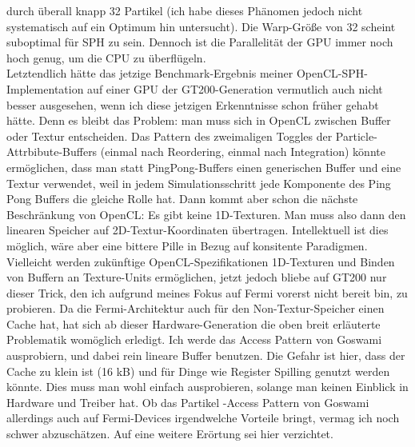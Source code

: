 \begin{enumerate}
		durch überall knapp 32 Partikel (ich habe dieses Phänomen jedoch nicht systematisch auf ein Optimum hin 	
		untersucht).
		Die Warp-Größe von 32 scheint suboptimal für SPH zu sein. Dennoch ist die Parallelität der GPU
		immer noch hoch genug, um die CPU zu überflügeln.\\
		Letztendlich hätte das jetzige Benchmark-Ergebnis meiner OpenCL-SPH-Implementation
		auf einer GPU der GT200-Generation vermutlich auch nicht besser ausgesehen, wenn ich diese 
		jetzigen Erkenntnisse schon früher gehabt hätte. Denn es bleibt das Problem: man muss sich in
		OpenCL zwischen Buffer oder Textur entscheiden.
		 Das Pattern des zweimaligen Toggles der Particle-Attrbibute-Buffers
		(einmal nach Reordering, einmal nach Integration) könnte ermöglichen, dass man statt PingPong-Buffers
		einen generischen Buffer und eine Textur verwendet, weil in jedem Simulationsschritt jede Komponente
		des Ping Pong Buffers die gleiche Rolle hat. Dann kommt aber schon die nächste Beschränkung von
		OpenCL: Es gibt keine 1D-Texturen. Man muss also dann den linearen Speicher auf 2D-Textur-Koordinaten
		übertragen. Intellektuell ist dies möglich, wäre aber eine bittere Pille in Bezug auf konsitente Paradigmen.
		Vielleicht werden zukünftige OpenCL-Spezifikationen 1D-Texturen und Binden von Buffern an Texture-Units
		ermöglichen, jetzt jedoch bliebe auf GT200 nur dieser Trick, den ich aufgrund meines Fokus auf Fermi vorerst 
		nicht bereit bin, zu probieren.
		Da die Fermi-Architektur auch für den Non-Textur-Speicher einen Cache hat, hat sich ab dieser
		Hardware-Generation die 
		oben breit erläuterte Problematik womöglich erledigt. Ich werde das Access Pattern von Goswami
		ausprobiern, und dabei  rein lineare Buffer benutzen. Die Gefahr ist hier, dass der Cache zu klein ist
		(16 kB) und für Dinge wie Register Spilling genutzt werden könnte. Dies muss man wohl einfach ausprobieren,
		solange man keinen Einblick in Hardware und Treiber hat.
		Ob das Partikel -Access Pattern von Goswami allerdings auch auf Fermi-Devices irgendwelche Vorteile bringt, 
		vermag ich noch schwer abzuschätzen. Auf eine weitere Erörtung sei hier verzichtet.
		
	\end{enumerate}	
	

